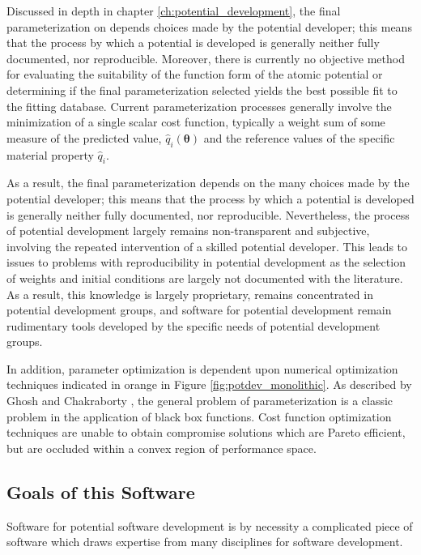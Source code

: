 Discussed in depth in chapter \ref{ch:potential_development}, the final parameterization on depends choices made by the potential developer; this means that the process by which a potential is developed is generally neither fully documented, nor reproducible.  Moreover, there is currently no objective method for evaluating the suitability of the function form of the atomic potential or determining if the final parameterization selected yields the best possible fit to the fitting database.  Current parameterization processes generally involve the minimization of a single scalar cost function, typically a weight sum of some measure of the predicted value, $\hat{q}_i(\bm{\theta})$ and the reference values of the specific material property $\hat{q}_i$.

As a result, the final parameterization depends on the many choices made by the potential developer; this means that the process by which a potential is developed is generally neither fully documented, nor reproducible.  Nevertheless, the process of potential development largely remains non-transparent and subjective,\cite{martinez2013_fitting,martinez2016_posmat} involving the repeated intervention of a skilled potential developer.\cite{brenner2000_fitting}
This leads to issues to problems with reproducibility in potential development as the selection of weights and initial conditions are largely not documented with the literature.
As a result, this knowledge is largely proprietary, remains concentrated in potential development groups, and software for potential development remain rudimentary tools developed by the specific needs of potential development groups.

In addition, parameter optimization is dependent upon numerical optimization techniques indicated in orange in Figure \ref{fig:potdev_monolithic}.  As described by Ghosh and Chakraborty \cite{ghosh2014_potdev_pareto}, the general problem of parameterization is a classic problem in the application of black box functions.  Cost function optimization techniques are unable to obtain compromise solutions which are Pareto efficient, but are occluded within a convex region of performance space.

\subsection{Goals of this Software}

Software for potential software development is by necessity a complicated piece of software which draws expertise from many disciplines for software development.

